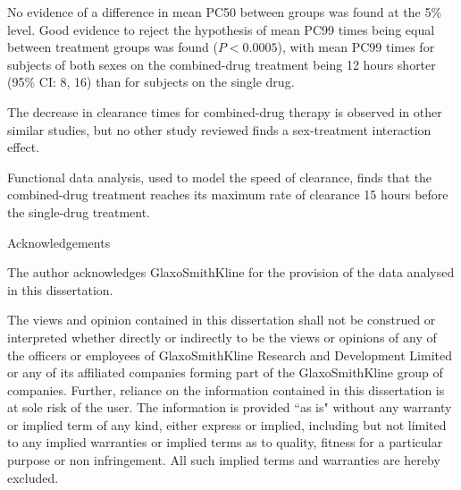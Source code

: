 \documentclass[a4paper,12pt,openright,twoside]{book}
\begin{document}
No evidence of a difference in mean PC50 between groups was found at the 5\% level. Good evidence to reject the hypothesis of mean PC99 times being equal between treatment groups was found ($P<0.0005$), with mean PC99 times for subjects of both sexes on the combined-drug treatment being 12 hours shorter (95\% CI: 8, 16) than for subjects on the single drug.

The decrease in clearance times for combined-drug therapy is observed in other similar studies, but no other study reviewed finds a sex-treatment interaction effect.

Functional data analysis, used to model the speed of clearance, finds that the combined-drug treatment reaches its maximum rate of clearance 15 hours before the single-drug treatment.
\pagebreak
\begin{center}
{\large Acknowledgements}\\[1cm]
\end{center}
The author acknowledges GlaxoSmithKline for the provision of the data analysed in this dissertation.

\pagebreak
\vspace*{\fill}
{\large The views and opinion contained in this dissertation shall not be construed or interpreted whether directly or indirectly to be the views or opinions of any of the officers or employees of GlaxoSmithKline Research and Development Limited or any of its affiliated companies forming part of the GlaxoSmithKline group of companies. Further, reliance on the information contained in this dissertation is at sole risk of the user. The information is provided ``as is" without any warranty or implied term of any kind, either express or implied, including but not limited to any implied warranties or implied terms as to quality, fitness for a particular purpose or non infringement. All such implied terms and warranties are hereby excluded.}
\vspace*{\fill}
\tableofcontents

\mainmatter
\setlength{\parindent}{0.0in}
\setlength{\parskip}{0.1in}







\addappheadtotoc
\appendix
\appendixpage


\backmatter

\renewcommand{\bibname}{References}
{\singlespace}
\end{document}
